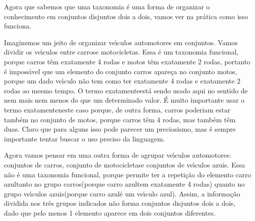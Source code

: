 \documentclass[
12pt,		%
openright,	%
twoside,  %
a4paper,			%
chapter=TITLE,		%
english,			%
french,				%
spanish,			%
brazil				%
]{USPSC-classe/USPSC}
\begin{document}
Agora que sabemos que uma taxonomia \'e uma forma de organizar o conhecimento em conjuntos disjuntos dois a dois, vamos ver na pr\'atica como isso funciona.









Imaginemos um jeito de organizar ve\'{\i}culos automotores em conjuntos. Vamos dividir os ve\'{\i}culos entre \textquotedbl carros\textquotedbl  e \textquotedbl motocicletas\textquotedbl . Essa \'e um taxonomia funcional, porque carros t\^em exatamente 4 rodas e motos t\^em exatamente 2 rodas, portanto \'e imposs\'{\i}vel que um elemento do conjunto carros apare\c{c}a no conjunto motos, porque um dado ve\'{\i}culo n\~ao tem como ter exatamente 4 rodas e exatamente 2 rodas ao mesmo tempo. O termo \textquotedbl exatamente\textquotedbl  est\'a sendo usado aqui no sentido de \textquotedbl nem mais nem menos do que um determinado valor\textquotedbl . \'E muito importante usar o termo \textquotedbl exatamente\textquotedbl  neste caso porque, de outra forma, carros poderiam estar tamb\'em no conjunto de motos, porque carros t\^em 4 rodas, mas tamb\'em t\^em duas. Claro que para alguns isso pode parecer um preciosismo, mas \'e sempre importante tentar buscar o uso preciso da linguagem.









Agora vamos pensar em uma outra forma de agrupar ve\'{\i}culos automotores: conjuntos de \textquotedbl carros\textquotedbl , conjunto de \textquotedbl motocicletas\textquotedbl  e conjuntos de \textquotedbl ve\'{\i}culos azuis\textquotedbl . Essa n\~ao \'e uma taxonomia funcional, porque permite ter a repeti\c{c}\~ao do elemento \textquotedbl carro azul\textquotedbl  tanto no grupo \textquotedbl carros\textquotedbl  (porque \textquotedbl carro azul\textquotedbl  tem exatamente 4 rodas) quanto no grupo \textquotedbl ve\'{\i}culos azuis\textquotedbl  (porque \textquotedbl carro azul\textquotedbl  \'e um \textquotedbl ve\'{\i}culo azul\textquotedbl ). Assim, a informa\c{c}\~ao dividida nos tr\^es grupos indicados n\~ao forma conjuntos disjuntos dois a dois, dado que pelo menos 1 elemento aparece em dois conjuntos diferentes.
\end{document}
